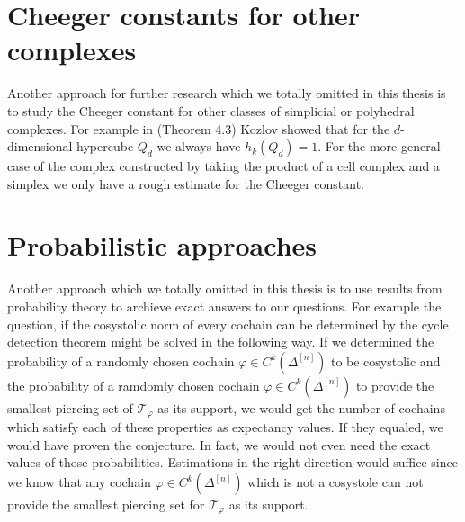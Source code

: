 \section{Cheeger constants for other complexes}

Another approach for further research which we totally omitted in this thesis is to study the Cheeger constant for other classes of simplicial or polyhedral complexes. For example in \cite{6} (Theorem 4.3) Kozlov showed that for the \(d\)-dimensional hypercube \(Q_d\) we always have \(h_k(Q_d)=1\). For the more general case of the complex constructed by taking the product of a cell complex and a simplex we only have a rough estimate for the Cheeger constant.

\section{Probabilistic approaches}

Another approach which we totally omitted in this thesis is to use results from probability theory to archieve exact answers to our questions. For example the question, if the cosystolic norm of every cochain can be determined by the cycle detection theorem might be solved in the following way. If we determined the probability of a randomly chosen cochain \(\varphi\in C^k(\Delta^{[n]})\) to be cosystolic and the probability of a ramdomly chosen cochain \(\varphi\in C^k(\Delta^{[n]})\) to provide the smallest piercing set of \(\mathcal{T}_{\varphi}\) as its support, we would get the number of cochains which satisfy each of these properties as expectancy values. If they equaled, we would have proven the conjecture. In fact, we would not even need the exact values of those probabilities. Estimations in the right direction would suffice since we know that any cochain \(\varphi\in C^k(\Delta^{[n]})\) which is not a cosystole can not provide the smallest piercing set for \(\mathcal{T}_{\varphi}\) as its support.